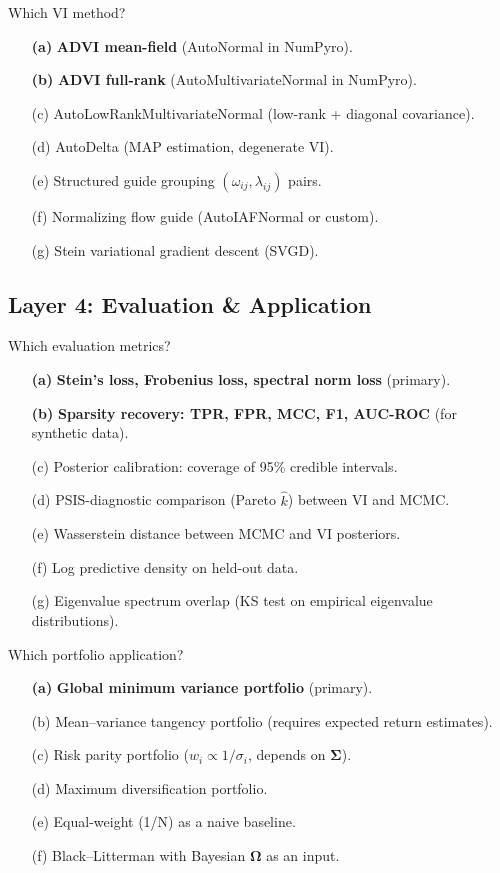 \documentclass[11pt,a4paper]{article}
\newcommand{\bOmega}{\bm{\Omega}}
\newcommand{\bSigma}{\bm{\Sigma}}
\begin{document}
\begin{decision}{Which VI method?}
\begin{enumerate}[nosep]
  \item[\textbf{(a)}] \textbf{ADVI mean-field} (AutoNormal in NumPyro).
  \item[\textbf{(b)}] \textbf{ADVI full-rank} (AutoMultivariateNormal in NumPyro).
  \item[(c)] AutoLowRankMultivariateNormal (low-rank + diagonal covariance).
  \item[(d)] AutoDelta (MAP estimation, degenerate VI).
  \item[(e)] Structured guide grouping $(\omega_{ij}, \lambda_{ij})$ pairs.
  \item[(f)] Normalizing flow guide (AutoIAFNormal or custom).
  \item[(g)] Stein variational gradient descent (SVGD).
\end{enumerate}
\end{decision}


\subsection{Layer 4: Evaluation \& Application}

\begin{decision}{Which evaluation metrics?}
\begin{enumerate}[nosep]
  \item[\textbf{(a)}] \textbf{Stein's loss, Frobenius loss, spectral norm loss} (primary).
  \item[\textbf{(b)}] \textbf{Sparsity recovery: TPR, FPR, MCC, F1, AUC-ROC} (for synthetic data).
  \item[(c)] Posterior calibration: coverage of 95\% credible intervals.
  \item[(d)] PSIS-diagnostic comparison (Pareto $\hat{k}$) between VI and MCMC.
  \item[(e)] Wasserstein distance between MCMC and VI posteriors.
  \item[(f)] Log predictive density on held-out data.
  \item[(g)] Eigenvalue spectrum overlap (KS test on empirical eigenvalue distributions).
\end{enumerate}
\end{decision}

\begin{decision}{Which portfolio application?}
\begin{enumerate}[nosep]
  \item[\textbf{(a)}] \textbf{Global minimum variance portfolio} (primary).
  \item[(b)] Mean--variance tangency portfolio (requires expected return estimates).
  \item[(c)] Risk parity portfolio ($w_i \propto 1/\sigma_i$, depends on $\bSigma$).
  \item[(d)] Maximum diversification portfolio.
  \item[(e)] Equal-weight (1/N) as a naive baseline.
  \item[(f)] Black--Litterman with Bayesian $\bOmega$ as an input.
\end{enumerate}
\end{decision}
\end{document}
